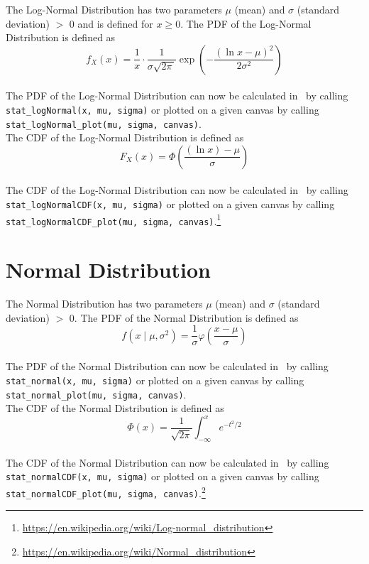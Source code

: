 		The Log-Normal Distribution has two parameters $\mu$ (mean) and $\sigma$ (standard deviation) $>$ 0 and is defined for $x \geq 0$. The \ac{PDF} of the Log-Normal Distribution is defined as
		\\[0.3cm]
		$$f_X(x) = \frac 1 x \cdot \frac 1 {\sigma\sqrt{2\pi\,}} \exp\left( -\frac{(\ln x-\mu)^2}{2\sigma^2} \right)$$
		\\[0.3cm]
		The \ac{PDF} of the Log-Normal Distribution can now be calculated in \setlx\ by calling \lstinline{stat_logNormal(x, mu, sigma)} or plotted on a given canvas by calling \lstinline{stat_logNormal_plot(mu, sigma, canvas)}.
		\\[0.3cm]
		The \ac{CDF} of the Log-Normal Distribution is defined as
		\\[0.3cm]
		$$F_X(x) = \Phi\left( \frac{(\ln x) - \mu} \sigma \right)$$
		\\[0.3cm]
		The \ac{CDF} of the Log-Normal Distribution can now be calculated in \setlx\ by calling \lstinline{stat_logNormalCDF(x, mu, sigma)} or plotted on a given canvas by calling \lstinline{stat_logNormalCDF_plot(mu, sigma, canvas)}.\footnote{\url{https://en.wikipedia.org/wiki/Log-normal_distribution}}

	\section{Normal Distribution}
	
		The Normal Distribution has two parameters $\mu$ (mean) and $\sigma$ (standard deviation) $>$ 0. The \ac{PDF} of the Normal Distribution is defined as
		\\[0.3cm]
		$$f(x \mid \mu, \sigma^2) =\frac 1 \sigma \varphi\left(\frac{x-\mu} \sigma \right)$$
		\\[0.3cm]
		The \ac{PDF} of the Normal Distribution can now be calculated in \setlx\ by calling \lstinline{stat_normal(x, mu, sigma)} or plotted on a given canvas by calling \lstinline{stat_normal_plot(mu, sigma, canvas)}.
		\\[0.3cm]
		The \ac{CDF} of the Normal Distribution is defined as
		\\[0.3cm]
		$$\Phi(x) = \frac 1 {\sqrt{2\pi}} \int_{-\infty}^x e^{-t^2/2}$$
		\\[0.3cm]
		The \ac{CDF} of the Normal Distribution can now be calculated in \setlx\ by calling \lstinline{stat_normalCDF(x, mu, sigma)} or plotted on a given canvas by calling \lstinline{stat_normalCDF_plot(mu, sigma, canvas)}.\footnote{\url{https://en.wikipedia.org/wiki/Normal_distribution}}
		
